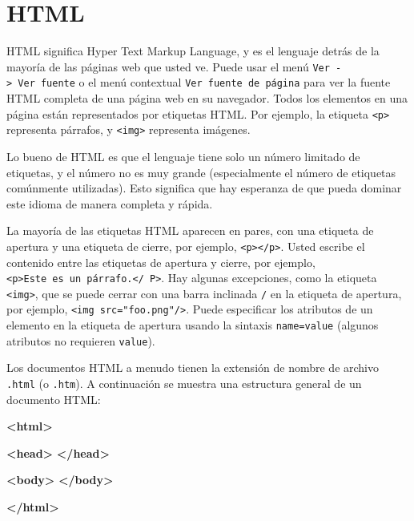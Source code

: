 \documentclass[12pt,]{krantz}
\makeatletter
\newenvironment{Shaded}{\begin{snugshade}}{\end{snugshade}}
\newcommand{\KeywordTok}[1]{\textcolor[rgb]{0.13,0.29,0.53}{\textbf{#1}}}
\newenvironment{kframe}{%
\medskip{}
\setlength{\fboxsep}{.8em}
 \def\at@end@of@kframe{}%
 \ifinner\ifhmode%
  \def\at@end@of@kframe{\end{minipage}}%
  \begin{minipage}{\columnwidth}%
 \fi\fi%
 \def\FrameCommand##1{\hskip\@totalleftmargin \hskip-\fboxsep
 \colorbox{shadecolor}{##1}\hskip-\fboxsep
     \hskip-\linewidth \hskip-\@totalleftmargin \hskip\columnwidth}%
 \MakeFramed {\advance\hsize-\width
   \@totalleftmargin\z@ \linewidth\hsize
   \@setminipage}}%
 {\par\unskip\endMakeFramed%
 \at@end@of@kframe}
\renewenvironment{Shaded}{\begin{kframe}}{\end{kframe}}
\theoremstyle{definition}
\theoremstyle{definition}
\theoremstyle{definition}
\theoremstyle{remark}
\makeatother
\begin{document}
\hypertarget{html}{%
\section{HTML}\label{html}}

HTML significa Hyper Text Markup Language, y es el lenguaje
detrás de la mayoría de las páginas web que usted ve. Puede usar el menú
\texttt{Ver\ -\textgreater{}\ Ver\ fuente} o el menú contextual
\texttt{Ver\ fuente\ de\ página} para ver la fuente HTML completa de una
página web en su navegador. Todos los elementos en una página están
representados por etiquetas HTML. Por ejemplo, la etiqueta
\texttt{\textless{}p\textgreater{}} representa párrafos, y
\texttt{\textless{}img\textgreater{}} representa imágenes.

Lo bueno de HTML es que el lenguaje tiene solo un número limitado de
etiquetas, y el número no es muy grande (especialmente el número de
etiquetas comúnmente utilizadas). Esto significa que hay esperanza de
que pueda dominar este idioma de manera completa y rápida.

La mayoría de las etiquetas HTML aparecen en pares, con una etiqueta de
apertura y una etiqueta de cierre, por ejemplo,
\texttt{\textless{}p\textgreater{}\textless{}/p\textgreater{}}. Usted
escribe el contenido entre las etiquetas de apertura y cierre, por
ejemplo,
\texttt{\textless{}p\textgreater{}Este\ es\ un\ párrafo.\textless{}/\ P\textgreater{}}.
Hay algunas excepciones, como la etiqueta
\texttt{\textless{}img\textgreater{}}, que se puede cerrar con una barra
inclinada \texttt{/} en la etiqueta de apertura, por ejemplo,
\texttt{\textless{}img\ src="foo.png"/\textgreater{}}. Puede especificar
los atributos de un elemento en la etiqueta de apertura usando la
sintaxis \texttt{name=value} (algunos atributos no requieren
\texttt{value}).

Los documentos HTML a menudo tienen la extensión de nombre de archivo
\texttt{.html} (o \texttt{.htm}). A continuación se muestra una
estructura general de un documento HTML:

\begin{Shaded}
\begin{Highlighting}[]
\KeywordTok{<html>}

  \KeywordTok{<head>}
  \KeywordTok{</head>}
  
  \KeywordTok{<body>}
  \KeywordTok{</body>}

\KeywordTok{</html>}
\end{Highlighting}
\end{Shaded}
\end{document}
